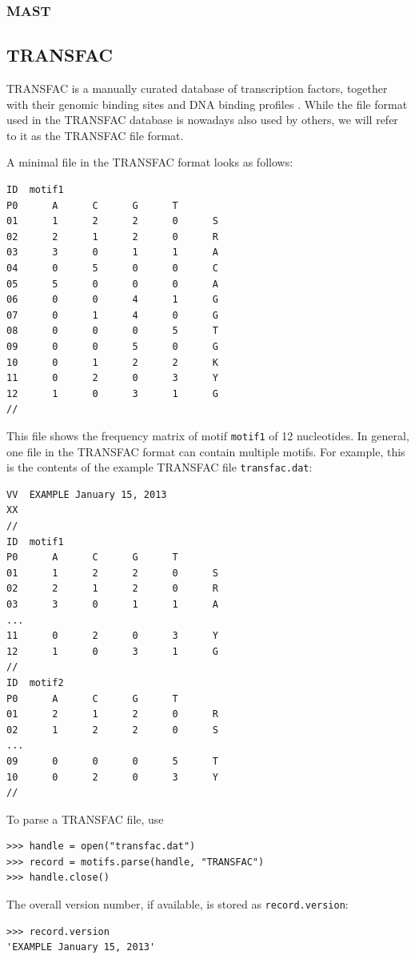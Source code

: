 \documentclass{report}
\begin{document}
\subsubsection*{MAST}

\subsection{TRANSFAC}

TRANSFAC is a manually curated database of transcription factors, together
with their genomic binding sites and DNA binding profiles \cite{matys2003}.
While the file format used in the TRANSFAC database is nowadays also used
by others, we will refer to it as the TRANSFAC file format.

A minimal file in the TRANSFAC format looks as follows:
\begin{verbatim}
ID  motif1
P0      A      C      G      T
01      1      2      2      0      S
02      2      1      2      0      R
03      3      0      1      1      A
04      0      5      0      0      C
05      5      0      0      0      A
06      0      0      4      1      G
07      0      1      4      0      G
08      0      0      0      5      T
09      0      0      5      0      G
10      0      1      2      2      K
11      0      2      0      3      Y
12      1      0      3      1      G
//
\end{verbatim}
This file shows the frequency matrix of motif \verb+motif1+ of 12 nucleotides.
In general, one file in the TRANSFAC format can contain multiple motifs. For
example, this is the contents of the example TRANSFAC file \verb+transfac.dat+:
\begin{verbatim}
VV  EXAMPLE January 15, 2013
XX
//
ID  motif1
P0      A      C      G      T
01      1      2      2      0      S
02      2      1      2      0      R
03      3      0      1      1      A
...
11      0      2      0      3      Y
12      1      0      3      1      G
//
ID  motif2
P0      A      C      G      T
01      2      1      2      0      R
02      1      2      2      0      S
...
09      0      0      0      5      T
10      0      2      0      3      Y
//
\end{verbatim}
To parse a TRANSFAC file, use
\begin{verbatim}
>>> handle = open("transfac.dat")
>>> record = motifs.parse(handle, "TRANSFAC")
>>> handle.close()
\end{verbatim}
The overall version number, if available, is stored as \verb+record.version+:
\begin{verbatim}
>>> record.version
'EXAMPLE January 15, 2013'
\end{verbatim}
\end{document}
